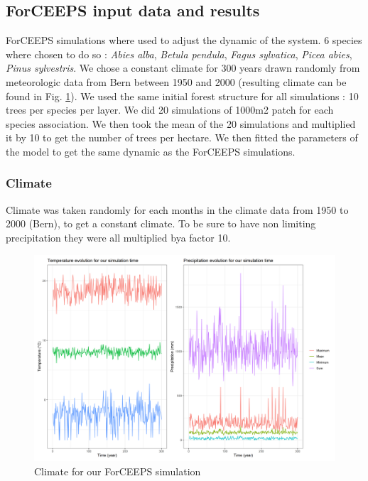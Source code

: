 \documentclass{article}
\begin{document}
\subsection{ForCEEPS input data and results}

ForCEEPS simulations where used to adjust the dynamic of the system. 6 species where chosen to do so : \textit{Abies alba}, \textit{Betula pendula}, \textit{Fagus sylvatica}, \textit{Picea abies}, \textit{Pinus sylvestris}. We chose a constant climate for 300 years drawn randomly from meteorologic data from Bern between 1950 and 2000 (resulting climate can be found in Fig. \ref{fig:climate}). We used the same initial forest structure for all simulations : 10 trees per species per layer. We did 20 simulations of 1000m2 patch for each species association. We then took the mean of the 20 simulations and multiplied it by 10 to get the number of trees per hectare. We then fitted the parameters of the model to get the same dynamic as the ForCEEPS simulations.

\subsubsection{Climate}

Climate was taken randomly for each months in the climate data from 1950 to 2000 (Bern), to get a constant climate. To be sure to have non limiting precipitation they were all multiplied bya factor 10.

\begin{figure}[H]
    \centering
    \includegraphics[width=1\textwidth]{Figure/Climate_simul.png}
    \caption{Climate for our ForCEEPS simulation}
    \label{fig:climate}
\end{figure}
\end{document}
